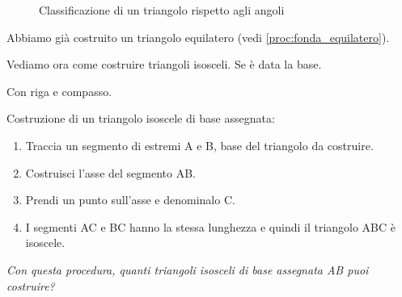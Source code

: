 \begin{inaccessibleblock}
\begin{figure}[htb]
\centering
\caption{Classificazione di un triangolo rispetto agli angoli}
\label{fig:class_triangolo_angoli}
\end{figure}
\end{inaccessibleblock}

Abbiamo già costruito un triangolo equilatero 
(vedi \ref{proc:fonda_equilatero}).

\begin{comment}
 
Con riga e compasso.

\begin{procedura}[Triangolo equilatero]\label{proc:fonda_equilatero}
  Dati due punti A e B, si deve costruire un punto C in modo che ABC sia un 
triangolo equilatero:
  \begin{enumerate} [nosep]
    \item 
    Traccia i punti A e B.
    \item 
    Traccia la circonferenza di centro A e passante per B.
    \item 
    Traccia la circonferenza di centro B e passante per A.
    \item 
    Individua un punto C di intersezione delle due circonferenze.
    \item 
    Il poligono ABC è il triangolo richiesto.    
  \end{enumerate}
\end{procedura}

Con la geometria interattiva.


\end{comment}

Vediamo ora come costruire triangoli isosceli. Se è data la base.

Con riga e compasso.

\begin{procedura}
  Costruzione di un triangolo isoscele di base assegnata:
  \begin{enumerate} [nosep]
    \item 
    Traccia un segmento di estremi A e B, base del triangolo da costruire.
    \item 
    Costruisci l'asse del segmento AB.
    \item 
    Prendi un punto sull'asse e denominalo C.
    \item 
    I segmenti AC e BC hanno la stessa lunghezza e quindi il triangolo ABC è 
isoscele.
  \end{enumerate}
\textit{ Con questa procedura, quanti triangoli isosceli di base assegnata AB 
puoi costruire?}  
\end{procedura}
 

